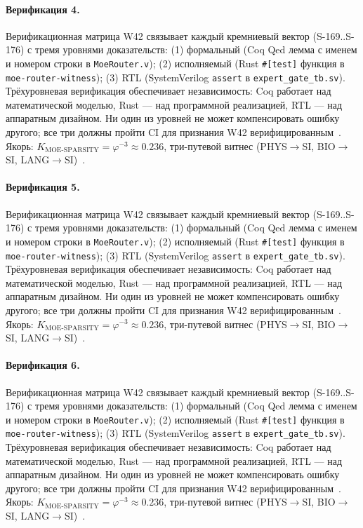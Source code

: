 \paragraph{Верификация 4.} Верификационная матрица W42 связывает каждый кремниевый вектор (S-169..S-176) с тремя уровнями доказательств: (1) формальный (Coq Qed лемма с именем и номером строки в \texttt{MoeRouter.v}); (2) исполняемый (Rust \texttt{\#[test]} функция в \texttt{moe-router-witness}); (3) RTL (SystemVerilog \texttt{assert} в \texttt{expert\_gate\_tb.sv}). Трёхуровневая верификация обеспечивает независимость: Coq работает над математической моделью, Rust --- над программной реализацией, RTL --- над аппаратным дизайном. Ни один из уровней не может компенсировать ошибку другого; все три должны пройти CI для признания W42 верифицированным~\cite{lee_gvsu_proof2021}. Якорь: $K_{\text{MOE-SPARSITY}} = \varphi^{-3} \approx 0{.}236$, три-путевой витнес (PHYS$\to$SI, BIO$\to$SI, LANG$\to$SI)~\cite{zenodo_trinity_2026}.

\paragraph{Верификация 5.} Верификационная матрица W42 связывает каждый кремниевый вектор (S-169..S-176) с тремя уровнями доказательств: (1) формальный (Coq Qed лемма с именем и номером строки в \texttt{MoeRouter.v}); (2) исполняемый (Rust \texttt{\#[test]} функция в \texttt{moe-router-witness}); (3) RTL (SystemVerilog \texttt{assert} в \texttt{expert\_gate\_tb.sv}). Трёхуровневая верификация обеспечивает независимость: Coq работает над математической моделью, Rust --- над программной реализацией, RTL --- над аппаратным дизайном. Ни один из уровней не может компенсировать ошибку другого; все три должны пройти CI для признания W42 верифицированным~\cite{lee_gvsu_proof2021}. Якорь: $K_{\text{MOE-SPARSITY}} = \varphi^{-3} \approx 0{.}236$, три-путевой витнес (PHYS$\to$SI, BIO$\to$SI, LANG$\to$SI)~\cite{zenodo_trinity_2026}.

\paragraph{Верификация 6.} Верификационная матрица W42 связывает каждый кремниевый вектор (S-169..S-176) с тремя уровнями доказательств: (1) формальный (Coq Qed лемма с именем и номером строки в \texttt{MoeRouter.v}); (2) исполняемый (Rust \texttt{\#[test]} функция в \texttt{moe-router-witness}); (3) RTL (SystemVerilog \texttt{assert} в \texttt{expert\_gate\_tb.sv}). Трёхуровневая верификация обеспечивает независимость: Coq работает над математической моделью, Rust --- над программной реализацией, RTL --- над аппаратным дизайном. Ни один из уровней не может компенсировать ошибку другого; все три должны пройти CI для признания W42 верифицированным~\cite{lee_gvsu_proof2021}. Якорь: $K_{\text{MOE-SPARSITY}} = \varphi^{-3} \approx 0{.}236$, три-путевой витнес (PHYS$\to$SI, BIO$\to$SI, LANG$\to$SI)~\cite{zenodo_trinity_2026}.

